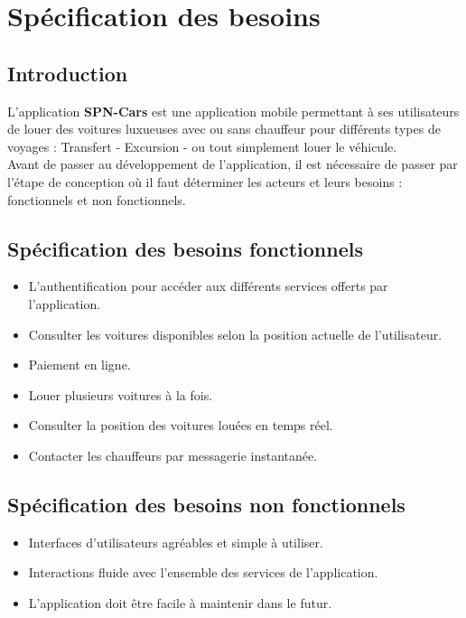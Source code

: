 \chapter{Spécification des besoins}
\minitoc
\cleardoublepage
\section*{Introduction}
L'application \textbf{SPN-Cars} est une application mobile permettant à ses utilisateurs de louer des voitures luxueuses avec ou sans chauffeur pour différents types de voyages : Transfert - Excursion - ou tout simplement louer le véhicule.\\
\noindent Avant de passer au développement de l'application, il est nécessaire de passer par l'étape de conception où il faut déterminer les acteurs et leurs besoins : fonctionnels et non fonctionnels.
\section{Spécification des besoins fonctionnels}
\begin{itemize}
    \item L'authentification pour accéder aux différents services offerts par l'application.
    \item Consulter les voitures disponibles selon la position actuelle de l'utilisateur.
    \item Paiement en ligne.
    \item Louer plusieurs voitures à la fois.
    \item Consulter la position des voitures louées en temps réel.
    \item Contacter les chauffeurs par messagerie instantanée.
\end{itemize}
\section{Spécification des besoins non fonctionnels}
\begin{itemize}
    \item Interfaces d'utilisateurs agréables et simple à utiliser.
    \item Interactions fluide avec l'ensemble des services de l'application.
    \item L'application doit être facile à maintenir dans le futur.
\end{itemize}
